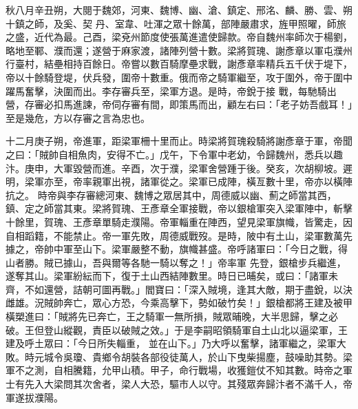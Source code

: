 \begin{pinyinscope}
 秋八月辛丑朔，大閱于魏郊，河東、魏博、幽、滄、鎮定、邢洺、麟、勝、雲、朔十鎮之師，及奚、契
 丹、室韋、吐渾之眾十餘萬，部陣嚴肅求，旌甲照曜，師旅之盛，近代為最。己酉，梁兗州節度使張萬進遣使歸款。帝自魏州率師次于楊劉，略地至鄆、濮而還；遂營于麻家渡，諸陣列營十數。梁將賀瑰、謝彥章以軍屯濮州行臺村，結壘相持百餘日。帝嘗以數百騎摩壘求戰，謝彥章率精兵五千伏于堤下，帝以十餘騎登堤，伏兵發，圍帝十數重。俄而帝之騎軍繼至，攻于圍外，帝于圍中躍馬奮擊，決圍而出。李存審兵至，梁軍方退。是時，帝銳于接
 戰，每馳騎出營，存審必扣馬進諫，帝伺存審有間，即策馬而出，顧左右曰：「老子妨吾戲耳！」至是幾危，方以存審之言為忠也。



 十二月庚子朔，帝進軍，距梁軍柵十里而止。時梁將賀瑰殺騎將謝彥章于軍，帝聞之曰：「賊帥自相魚肉，安得不亡。」戊午，下令軍中老幼，令歸魏州，悉兵以趣汴。庚申，大軍毀營而進。辛酉，次于濮，梁軍舍營踵于後。癸亥，次胡柳坡。遲明，梁軍亦至，帝率親軍出視，諸軍從之。梁軍已成陣，橫亙數十里，帝亦以橫陣抗之。
 時帝與李存審總河東、魏博之眾居其中，周德威以幽、薊之師當其西，鎮、定之師當其東。梁將賀瑰、王彥章全軍接戰，帝以銀槍軍突入梁軍陣中，斬擊十餘里，賀瑰、王彥章單騎走濮陽。帝軍輜重在陣西，望見梁軍旗幟，皆驚走，因自相蹈籍，不能禁止。帝一軍先敗，周德威戰歿。是時，陂中有土山，梁軍數萬先據之，帝帥中軍至山下。梁軍嚴整不動，旗幟甚盛。帝呼諸軍曰：「今日之戰，得山者勝。賊已據山，吾與爾等各馳一騎以奪之！」帝率軍
 先登，銀槍步兵繼進，遂奪其山。梁軍紛紜而下，復于土山西結陣數里。時日已晡矣，或曰：「諸軍未齊，不如還營，詰朝可圖再戰。」閻寶曰：「深入賊境，逢其大敵，期于盡銳，以決雌雄。況賊帥奔亡，眾心方恐，今乘高擊下，勢如破竹矣！」銀槍都將王建及被甲橫槊進曰：「賊將先已奔亡，王之騎軍一無所損，賊眾晡晚，大半思歸，擊之必破。王但登山縱觀，責臣以破賊之效。」于是李嗣昭領騎軍自土山北以逼梁軍，王建及呼土眾曰：「今日所失輜重，
 並在山下。」乃大呼以奮擊，諸軍繼之，梁軍大敗。時元城令吳瓊、貴鄉令胡裝各部役徒萬人，於山下曳柴揚塵，鼓噪助其勢。梁軍不之測，自相騰籍，允甲山積。甲子，命行戰場，收獲鎧仗不知其數。時帝之軍士有先入大梁問其次舍者，梁人大恐，驅市人以守。其殘眾奔歸汴者不滿千人，帝軍遂拔濮陽。



\end{pinyinscope}